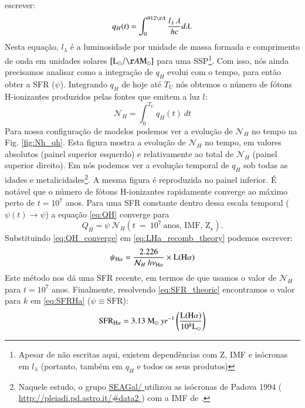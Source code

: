 escrever:
\begin{equation}
	q_H(t) = \int_0^{912\AA} \frac{l_\lambda\ \lambda}{h c} d\lambda.
	\label{eq:qH}
\end{equation}
\noindent Nesta equação, $l_\lambda$ é a luminosidade por unidade de massa formada e comprimento de
onda em unidades solares $[\textrm{L}_\odot/\AA\textrm{M}_\odot]$ para uma SSP\footnote{Apesar de
não escritas aqui, existem dependências com Z, IMF e isócronas em $l_\lambda$ (portanto, também em
$q_H$ e todos os seus produtos)}. Com isso, nós ainda precisamos analisar como a integração de
$q_H$ evolui com o tempo, para então obter a SFR ($\psi$). Integrando $q_H$ de hoje até $T_U$ nós
obtemos o número de fótons H-ionizantes produzidos pelas fontes que emitem a luz $l$:
\begin{equation}
	\mathcal{N}_H = \int_0^{T_U} q_H(t)\ dt
\end{equation}
Para nossa configuração de modelos podemos ver a evolução de $\mathcal{N}_H$ no tempo na Fig.
\ref{fig:Nh_qh}. Esta figura mostra a evolução de $\mathcal{N}_H$ no tempo, em valores absolutos
(painel superior esquerdo) e relativamente ao total de $\mathcal{N}_H$ (painel superior direito).
Em \citet[Fig. 2b]{CidFernandes.etal.2011a} nós podemos ver a evolução temporal de $q_H$ sob
todas as idades e metalicidades\footnote{Naquele estudo, o grupo 
	\href{
		http://starlight.ufsc.br
	}{
		SEAGal/\STARLIGHT
	} utilizou as isócronas de Padova 1994 (
	\href{
		http://pleiadi.pd.astro.it/#data2
	}{
		http://pleiadi.pd.astro.it/\#data2
	}
	) com a IMF de \citet{Chabrier.2003a}.
}. A mesma figura é reproduzida no painel inferior. É notável que o número de fótons H-ionizantes
rapidamente converge ao máximo perto de $t = 10^7$ anos. Para uma SFR constante dentro dessa escala
temporal ($\psi(t)\rightarrow \psi$) a equação \eqref{eq:QH} converge para
\begin{equation}
	Q_H = \psi\ \mathcal{N}_H(t\ =\ 10^7\ \textrm{anos, IMF, Z}{}_\star).
	\label{eq:QH_converge}
\end{equation}
\noindent Substituindo \eqref{eq:QH_converge} em \eqref{eq:LHa_recomb_theory} podemos escrever:
\begin{equation}
	\psi_{\Halpha} = \frac{2.226}{\mathcal{N}_H\ h \nu_{\Halpha}} \times \mathrm{L}(\Halpha)
	\label{eq:SFR_theoric}
\end{equation}
\noindent Este método nos dá uma SFR recente, em termos de que usamos o valor de $\mathcal{N}_H$
para $t = 10^7$ anos. Finalmente, resolvendo \eqref{eq:SFR_theoric} encontramos o valor para $k$ em
\eqref{eq:SFRHa} ($\psi \equiv \mathrm{SFR}$):
\begin{equation}
	\label{eq:SFRNeb}
	\mathrm{SFR}_{\Halpha} = 3.13\ \mathrm{M}_\odot\ yr^{-1}
	\left(\frac{\mathrm{L}(\Halpha)}{10^8\mathrm{L}_\odot}\right)
\end{equation}


